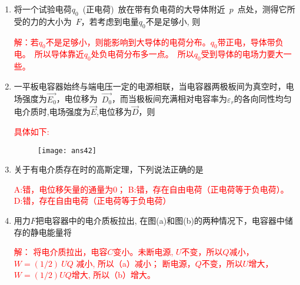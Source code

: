 \begin{enumerate}
\begin{note}
{        }
    \end{note}
    \item 将一个试验电荷$q_0$~(正电荷)~放在带有负电荷的大导体附近~$p$~点处，测得它所受的力的大小为~$F$，若考虑到电量$q_0$不是足够小, 则~
    \begin{note}
        \textcolor{red}{解：若$q_0$不是足够小，则能影响到大导体的电荷分布。$q_0$带正电，导体带负电。\ 所以导体靠近$q_0$处负电荷分布多一点。\ 所以$q_0$受到导体的电场力要大一些。
        }
    \end{note}
    \item 一平板电容器始终与端电压一定的电源相联，当电容器两极板间为真空时，电场强度为$\vec{E_0}$，电位移为~$\vec{D_0}$，而当极板间充满相对电容率为$\varepsilon_r$的各向同性均匀电介质时,电场强度为$\vec{E}$,电位移为$\vec{D}$，则~
    \begin{note}
        \textcolor{red}{具体如下:}
        \begin{figure}[H]
            \centering
            \texttt{[image: ans42]}
        \end{figure}
    \end{note}
    \item 关于有电介质存在时的高斯定理，下列说法正确的是~
    \begin{note}
        \textcolor{red}{A:错，电位移矢量的通量为0； B:错，存在自由电荷（正电荷等于负电荷）。D:错，存在自由电荷（正电荷等于负电荷） 
        }
    \end{note}
    \item 用力$F$把电容器中的电介质板拉出, 在图(a)和图(b)的两种情况下，电容器中储存的静电能量将~
    \begin{note}
        \textcolor{red}{解： 将电介质拉出，电容$C$变小。未断电源, $U$不变，所以$Q$减小，$W=(1/2)~UQ$ 减小,  所以（a）减小；
        断电源，$Q$不变，所以$U$增大，$W=(1/2)UQ$增大, 所以（b）增大。
}
\end{note}
\end{enumerate}
